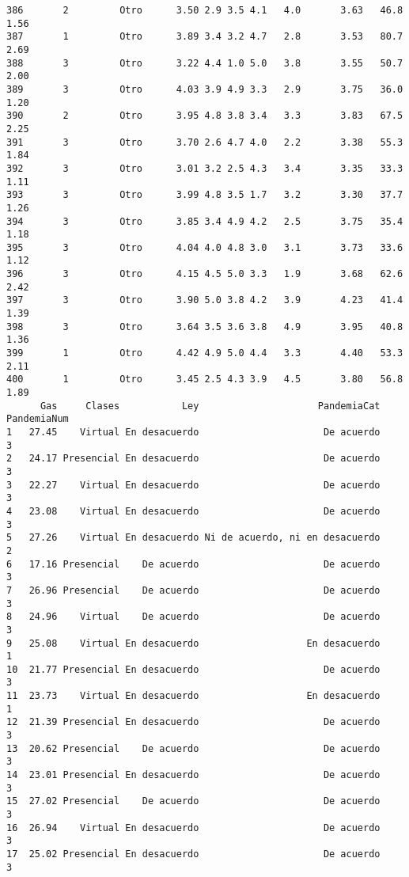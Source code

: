 \documentclass[
  letterpaper,
  DIV=11,
  numbers=noendperiod]{scrartcl}
\begin{document}
\begin{verbatim}
386       2         Otro      3.50 2.9 3.5 4.1   4.0       3.63   46.8    1.56
387       1         Otro      3.89 3.4 3.2 4.7   2.8       3.53   80.7    2.69
388       3         Otro      3.22 4.4 1.0 5.0   3.8       3.55   50.7    2.00
389       3         Otro      4.03 3.9 4.9 3.3   2.9       3.75   36.0    1.20
390       2         Otro      3.95 4.8 3.8 3.4   3.3       3.83   67.5    2.25
391       3         Otro      3.70 2.6 4.7 4.0   2.2       3.38   55.3    1.84
392       3         Otro      3.01 3.2 2.5 4.3   3.4       3.35   33.3    1.11
393       3         Otro      3.99 4.8 3.5 1.7   3.2       3.30   37.7    1.26
394       3         Otro      3.85 3.4 4.9 4.2   2.5       3.75   35.4    1.18
395       3         Otro      4.04 4.0 4.8 3.0   3.1       3.73   33.6    1.12
396       3         Otro      4.15 4.5 5.0 3.3   1.9       3.68   62.6    2.42
397       3         Otro      3.90 5.0 3.8 4.2   3.9       4.23   41.4    1.39
398       3         Otro      3.64 3.5 3.6 3.8   4.9       3.95   40.8    1.36
399       1         Otro      4.42 4.9 5.0 4.4   3.3       4.40   53.3    2.11
400       1         Otro      3.45 2.5 4.3 3.9   4.5       3.80   56.8    1.89
      Gas     Clases           Ley                     PandemiaCat PandemiaNum
1   27.45    Virtual En desacuerdo                      De acuerdo           3
2   24.17 Presencial En desacuerdo                      De acuerdo           3
3   22.27    Virtual En desacuerdo                      De acuerdo           3
4   23.08    Virtual En desacuerdo                      De acuerdo           3
5   27.26    Virtual En desacuerdo Ni de acuerdo, ni en desacuerdo           2
6   17.16 Presencial    De acuerdo                      De acuerdo           3
7   26.96 Presencial    De acuerdo                      De acuerdo           3
8   24.96    Virtual    De acuerdo                      De acuerdo           3
9   25.08    Virtual En desacuerdo                   En desacuerdo           1
10  21.77 Presencial En desacuerdo                      De acuerdo           3
11  23.73    Virtual En desacuerdo                   En desacuerdo           1
12  21.39 Presencial En desacuerdo                      De acuerdo           3
13  20.62 Presencial    De acuerdo                      De acuerdo           3
14  23.01 Presencial En desacuerdo                      De acuerdo           3
15  27.02 Presencial    De acuerdo                      De acuerdo           3
16  26.94    Virtual En desacuerdo                      De acuerdo           3
17  25.02 Presencial En desacuerdo                      De acuerdo           3

\end{verbatim}
\end{document}
